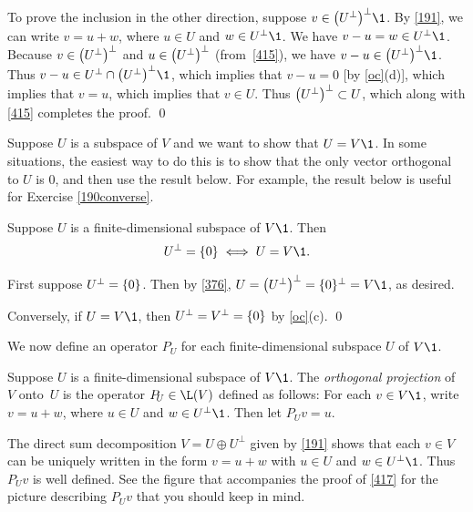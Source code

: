 To prove the inclusion in the other direction, suppose $v \in \paren[\big]{U^\perp}^\perp\1$.  By \ref{191}, we can write $v = u + w$, where
$u \in U$ and $w \in U^\perp\1$.  We have $v - u = w \in U^\perp\1$.  Because
$v \in \paren[\big]{U^\perp}^\perp$ and $u \in \paren[\big]{U^\perp}^\perp$
(from~\ref{415}), we have $v - u \in \paren[\big]{U^\perp}^\perp\1$.  Thus
$v - u \in  U^\perp \cap \paren[\big]{U^\perp}^\perp\1$,
which implies that $v - u = 0$ [by \ref{oc}(d)], which implies that $v = u$, which implies that
$v \in  U$.  Thus $\paren[\big]{U^\perp}^\perp \subset U$, which along with \ref{415}
completes the proof.
\qed

\pagebreak[3]


Suppose $U$ is a subspace of $V$ and we want to show that $U = V\1$. In some situations, the easiest way to do this is to show that the only vector orthogonal to $U$ is $0$, and then use the result below. For example, the result below is useful for Exercise \ref{190converse}.

{Suppose $U$ is a finite-dimensional subspace of $V\1$.  Then
\[
U^\perp = \{0\} \iff U = V\1.
\]}

\proof
First suppose $U^\perp = \br{0}$. Then by \ref{376}, $U = \paren[\big]{U^\perp}^\perp = \br{0}^\perp= V\1$, as desired.

Conversely, if $U = V\1$, then $U^\perp = V^\perp = \br{0}$ by \ref{oc}(c).
\qed

We now define an operator $P_{\!U}$ for each finite-dimensional subspace $U$ of $V\1$.

{Suppose $U$ is a finite-dimensional subspace of $V\1$. The \emph{orthogonal \mbox{projection}} of~$V$ onto~$U$ is the operator $P_{\!U} \in \L(V)$ defined as follows: For each $v \in V\1$, write $v = u + w$, where $u \in U$ and $w \in U^\perp\1$. Then let $P_{\!U} v = u$.}

The direct sum decomposition $V = U \oplus U^\perp$ given by \ref{191} shows that each $v \in V$ can be uniquely written in the form
$v = u + w$ with $u \in U$ and $w \in U^\perp\1$. Thus $P_{\!U} v$ is well defined. See the figure that accompanies the proof of \ref{417} for the picture describing $P_{\!U} v$ that you should keep in mind.

